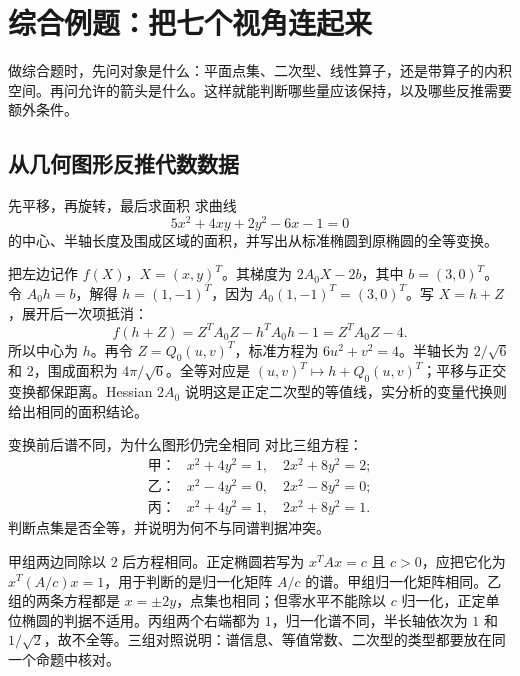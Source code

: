 \chapter{综合例题：把七个视角连起来}
\label{ch:synthesis}

做综合题时，先问对象是什么：平面点集、二次型、线性算子，还是带算子的内积空间。再问允许的箭头是什么。这样就能判断哪些量应该保持，以及哪些反推需要额外条件。

\section{从几何图形反推代数数据}

\begin{example}{先平移，再旋转，最后求面积}
求曲线
\[
5x^2+4xy+2y^2-6x-1=0
\]
的中心、半轴长度及围成区域的面积，并写出从标准椭圆到原椭圆的全等变换。
\end{example}
\begin{solution}
把左边记作 $f(X)$，$X=(x,y)^T$。其梯度为 $2A_0X-2b$，其中 $b=(3,0)^T$。令 $A_0h=b$，解得 $h=(1,-1)^T$，因为 $A_0(1,-1)^T=(3,0)^T$。写 $X=h+Z$，展开后一次项抵消：
\[
f(h+Z)=Z^TA_0Z-h^TA_0h-1=Z^TA_0Z-4.
\]
所以中心为 $h$。再令 $Z=Q_0(u,v)^T$，标准方程为 $6u^2+v^2=4$。半轴长为 $2/\sqrt6$ 和 $2$，围成面积为 $4\pi/\sqrt6$。全等对应是 $(u,v)^T\mapsto h+Q_0(u,v)^T$；平移与正交变换都保距离。Hessian $2A_0$ 说明这是正定二次型的等值线，实分析的变量代换则给出相同的面积结论。
\end{solution}

\begin{example}{变换前后谱不同，为什么图形仍完全相同}
对比三组方程：
\[
\begin{array}{ll}
\text{甲：}&x^2+4y^2=1,\quad 2x^2+8y^2=2;\\
\text{乙：}&x^2-4y^2=0,\quad 2x^2-8y^2=0;\\
\text{丙：}&x^2+4y^2=1,\quad 2x^2+8y^2=1.
\end{array}
\]
判断点集是否全等，并说明为何不与同谱判据冲突。
\end{example}
\begin{solution}
甲组两边同除以 $2$ 后方程相同。正定椭圆若写为 $x^TAx=c$ 且 $c>0$，应把它化为 $x^T(A/c)x=1$，用于判断的是归一化矩阵 $A/c$ 的谱。甲组归一化矩阵相同。乙组的两条方程都是 $x=\pm2y$，点集也相同；但零水平不能除以 $c$ 归一化，正定单位椭圆的判据不适用。丙组两个右端都为 $1$，归一化谱不同，半长轴依次为 $1$ 和 $1/\sqrt2$，故不全等。三组对照说明：谱信息、等值常数、二次型的类型都要放在同一个命题中核对。
\end{solution}

